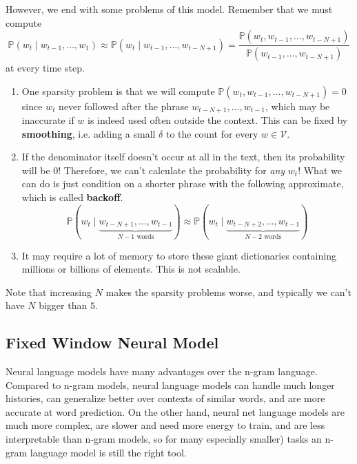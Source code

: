 \documentclass{article}
\begin{document}
    However, we end with some problems of this model. Remember that we must compute 
    \[\mathbb{P}(w_t \mid w_{t-1}, \ldots, w_{1}) \approx \mathbb{P}( w_t \mid w_{t-1}, \ldots, w_{t - N + 1}) = \frac{\mathbb{P}(w_t, w_{t-1}, \ldots, w_{t-N+1})}{\mathbb{P}(w_{t-1}, \ldots, w_{t-N+1})}\]
    at every time step.
    \begin{enumerate}
        \item One sparsity problem is that we will compute $\mathbb{P}(w_t, w_{t-1}, \ldots, w_{t-N+1}) = 0$ since $w_t$ never followed after the phrase $w_{t-N+1}, \ldots, w_{t-1}$, which may be inaccurate if $w$ is indeed used often outside the context. This can be fixed by \textbf{smoothing}, i.e. adding a small $\delta$ to the count for every $w \in \mathcal{V}$. 
        
        \item If the denominator itself doesn't occur at all in the text, then its probability will be $0$! Therefore, we can't calculate the probability for \textit{any} $w_t$! What we can do is just condition on a shorter phrase with the following approximate, which is called \textbf{backoff}. 
        \[\mathbb{P}( w_t \mid \underbrace{w_{t - N + 1}, \ldots, w_{t-1}}_{N-1 \text{ words}}) \approx \mathbb{P}( w_t \mid \underbrace{w_{t - N + 2}, \ldots, w_{t-1}}_{N-2 \text{ words}})\]

        \item It may require a lot of memory to store these giant dictionaries containing millions or billions of elements. This is not scalable. 
        
    \end{enumerate}
    Note that increasing $N$ makes the sparsity problems worse, and typically we can't have $N$ bigger than $5$. 

  \subsection{Fixed Window Neural Model}

    Neural language models have many advantages over the n-gram language. Compared to n-gram models, neural language models can handle much longer histories, can generalize better over contexts of similar words, and are more accurate at word prediction. On the other hand, neural net language models are much more complex, are slower and need more energy to train, and are less interpretable than n-gram models, so for many 
    especially smaller) tasks an n-gram language model is still the right tool. 
\end{document}
